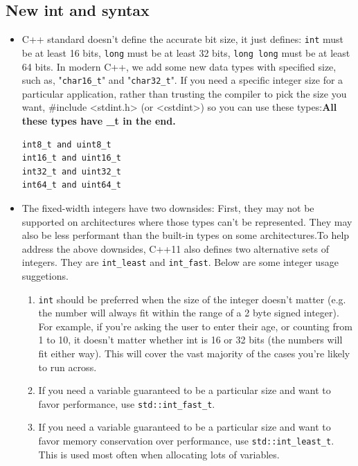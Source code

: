 \documentclass[a4paper,11pt,twoside]{book}
\begin{document}
\subsection{New int and syntax}
\begin{itemize}

    \item C++ standard doesn't define the accurate bit size, it just defines: \texttt{int} must be at least 16 bits, \texttt{long} must be at least 32 bits, \texttt{long long} must be at least 64 bits.
    In modern C++, we add some new data types with specified size, such as, "\texttt{char16\_t}"  and "\texttt{char32\_t}". If you need a specific integer size for a particular application, rather than trusting the compiler to pick the size you want, \#include <stdint.h> (or <cstdint>) so you can use these types:\textbf{All these types have \_t in the end.}
\begin{lstlisting}[numbers=none]
int8_t and uint8_t
int16_t and uint16_t
int32_t and uint32_t
int64_t and uint64_t
\end{lstlisting}

    \item The fixed-width integers have two downsides: First, they may not be supported on architectures where those types can't be represented. They may also be less performant than the built-in types on some architectures.To help address the above downsides, C++11 also defines two alternative sets of integers. They are \texttt{int\_least} and \texttt{int\_fast}. Below are some integer usage suggetions. 

\begin{enumerate}
	\item \texttt{int} should be preferred when the size of the integer doesn't matter (e.g. the number will always fit within the range of a 2 byte signed integer). For example, if you're asking the user to enter their age, or counting from 1 to 10, it doesn't matter whether int is 16 or 32 bits (the numbers will fit either way). This will cover the vast majority of the cases you're likely to run across.
	
	\item If you need a variable guaranteed to be a particular size and want to favor performance, use \texttt{std::int\_fast\_t}.
	
	\item If you need a variable guaranteed to be a particular size and want to favor memory conservation over performance, use \texttt{std::int\_least\_t}. This is used most often when allocating lots of variables.
	

\end{enumerate}
\end{itemize}
\end{document}
